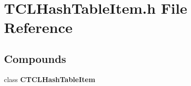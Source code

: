 \section{TCLHash\-Table\-Item.h File Reference}
\label{TCLHashTableItem_8h}
\subsection*{Compounds}
\begin{CompactItemize}
\item 
class {\bf CTCLHash\-Table\-Item}
\end{CompactItemize}
